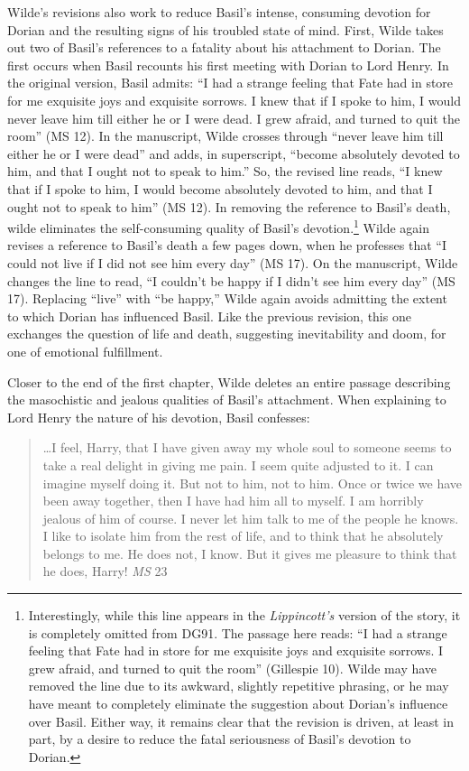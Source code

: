 \documentclass[11pt]{article}
\begin{document}
Wilde’s revisions also work to reduce Basil’s intense, consuming
devotion for Dorian and the resulting signs of his troubled state of
mind. First, Wilde takes out two of Basil’s references to a fatality
about his attachment to Dorian. The first occurs when Basil recounts
his first meeting with Dorian to Lord Henry. In the original version,
Basil admits: “I had a strange feeling that Fate had in store for me
exquisite joys and exquisite sorrows. I knew that if I spoke to him, I
would never leave him till either he or I were dead. I grew afraid,
and turned to quit the room” (MS 12). In the manuscript, Wilde crosses
through “never leave him till either he or I were dead” and adds, in
superscript, “become absolutely devoted to him, and that I ought not
to speak to him.” So, the revised line reads, “I knew that if I spoke
to him, I would become absolutely devoted to him, and that I ought not
to speak to him” (MS 12).  In removing the reference to Basil’s death,
wilde eliminates the self-consuming quality of Basil's
devotion.\footnote{Interestingly, while this line appears in the \emph{Lippincott’s}
version of the story, it is completely omitted from DG91. The passage
here reads: “I had a strange feeling that Fate had in store for me
exquisite joys and exquisite sorrows. I grew afraid, and turned to
quit the room” (Gillespie 10).  Wilde may have removed the line due to
its awkward, slightly repetitive phrasing, or he may have meant to
completely eliminate the suggestion about Dorian’s influence over
Basil. Either way, it remains clear that the revision is driven, at
least in part, by a desire to reduce the fatal seriousness of Basil’s
devotion to Dorian.} Wilde again revises a reference to Basil’s death a
few pages down, when he professes that “I could not live if I did not
see him every day” (MS 17). On the manuscript, Wilde changes the line
to read, “I couldn’t be happy if I didn’t see him every day” (MS
17). Replacing “live” with “be happy,” Wilde again avoids admitting
the extent to which Dorian has influenced Basil. Like the previous
revision, this one exchanges the question of life and death,
suggesting inevitability and doom, for one of emotional fulfillment.

Closer to the end of the first chapter, Wilde deletes an entire
passage describing the masochistic and jealous qualities of Basil’s
attachment. When explaining to Lord Henry the nature of his devotion,
Basil confesses:

\begin{quote}
\ldots{}I feel, Harry, that I have given away my whole soul to someone
seems to take a real delight in giving me pain. I seem quite adjusted
to it. I can imagine myself doing it. But not to him, not to him. Once
or twice we have been away together, then I have had him all to
myself. I am horribly jealous of him of course. I never let him talk
to me of the people he knows. I like to isolate him from the rest of
life, and to think that he absolutely belongs to me. He does not, I
know. But it gives me pleasure to think that he does, Harry! \emph{MS} 23
\end{quote}
\end{document}
